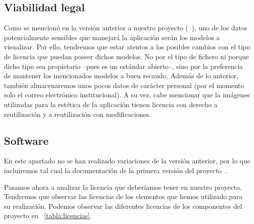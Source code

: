\subsection{Viabilidad legal}
Como se mencionó en la versión anterior a nuestro proyecto (~\cite{github:alberto-viewer}), uno de los datos potencialmente sensibles que manejará la aplicación serán los modelos a visualizar. Por ello, tendremos que estar atentos a los posibles cambios con el tipo de licencia que puedan poseer dichos modelos. No por el tipo de fichero ni porque dicho tipo sea propietario --pues es un estándar abierto--, sino por la preferencia de mantener los mencionados modelos a buen recaudo. Además de lo anterior, también almacenaremos unos pocos datos de carácter personal (por el momento solo el correo electrónico institucional).
A su vez, cabe mencionar que la imágenes utilizadas para la estética de la aplicación tienen licencia con derecho a reutilización y a reutilización con modificaciones.

\subsection{Software}
En este apartado no se han realizado variaciones de la versión anterior, por lo que incluiremos tal cual la documentación de la primera versión del proyecto~\cite{github:alberto-viewer}.

Pasamos ahora a analizar la licencia que deberíamos tener en nuestro proyecto. Tendremos que observar las licencias de los elementos que hemos utilizado para su realización.
Podemos observar las diferentes licencias de los componentes del proyecto en ~\ref{tabla:licencias}.


